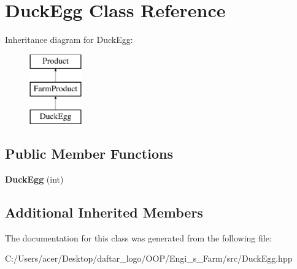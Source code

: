 \hypertarget{class_duck_egg}{}\section{Duck\+Egg Class Reference}
\label{class_duck_egg}
Inheritance diagram for Duck\+Egg\+:\begin{figure}[H]
\begin{center}
\leavevmode
\includegraphics[height=3.000000cm]{class_duck_egg}
\end{center}
\end{figure}
\subsection*{Public Member Functions}
\begin{DoxyCompactItemize}
\item 
\mbox{\label{class_duck_egg_a61d170e2f530c0719ec43dabcedb81a5}} 
{\bfseries Duck\+Egg} (int)
\end{DoxyCompactItemize}
\subsection*{Additional Inherited Members}


The documentation for this class was generated from the following file\+:\begin{DoxyCompactItemize}
\item 
C\+:/\+Users/acer/\+Desktop/daftar\+\_\+logo/\+O\+O\+P/\+Engi\+\_\+s\+\_\+\+Farm/src/Duck\+Egg.\+hpp\end{DoxyCompactItemize}
